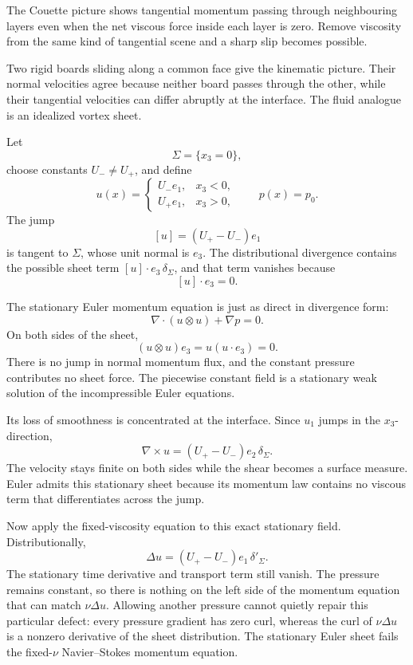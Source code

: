 The Couette picture shows tangential momentum passing through neighbouring layers even when the net viscous force inside each layer is zero.
Remove viscosity from the same kind of tangential scene and a sharp slip becomes possible.

Two rigid boards sliding along a common face give the kinematic picture.
Their normal velocities agree because neither board passes through the other, while their tangential velocities can differ abruptly at the interface.
The fluid analogue is an idealized vortex sheet.

Let
\[
  \Sigma=\{x_3=0\},
\]
choose constants \(U_-\neq U_+\), and define
\[
  u(x)=
  \begin{cases}
    U_-e_1, & x_3<0,\\
    U_+e_1, & x_3>0,
  \end{cases}
  \qquad
  p(x)=p_0.
\]
The jump
\[
  [u]=(U_+-U_-)e_1
\]
is tangent to \(\Sigma\), whose unit normal is \(e_3\).
The distributional divergence contains the possible sheet term \([u]\cdot e_3\,\delta_\Sigma\), and that term vanishes because
\[
  [u]\cdot e_3=0.
\]

The stationary Euler momentum equation is just as direct in divergence form:
\[
  \nabla\cdot(u\otimes u)+\nabla p=0.
\]
On both sides of the sheet,
\[
  (u\otimes u)e_3=u(u\cdot e_3)=0.
\]
There is no jump in normal momentum flux, and the constant pressure contributes no sheet force.
The piecewise constant field is a stationary weak solution of the incompressible Euler equations.

Its loss of smoothness is concentrated at the interface.
Since \(u_1\) jumps in the \(x_3\)-direction,
\[
  \nabla\times u
  =
  (U_+-U_-)e_2\,\delta_\Sigma.
\]
The velocity stays finite on both sides while the shear becomes a surface measure.
Euler admits this stationary sheet because its momentum law contains no viscous term that differentiates across the jump.

Now apply the fixed-viscosity equation to this exact stationary field.
Distributionally,
\[
  \Delta u
  =
  (U_+-U_-)e_1\,\delta'_\Sigma.
\]
The stationary time derivative and transport term still vanish.
The pressure remains constant, so there is nothing on the left side of the momentum equation that can match \(\nu\Delta u\).
Allowing another pressure cannot quietly repair this particular defect: every pressure gradient has zero curl, whereas the curl of \(\nu\Delta u\) is a nonzero derivative of the sheet distribution.
The stationary Euler sheet fails the fixed-\(\nu\) Navier--Stokes momentum equation.

